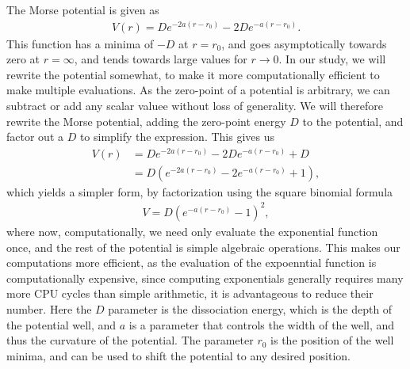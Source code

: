 \documentclass{subfiles}
\begin{document}
The Morse potential is given as
\begin{align*}
    V(r) = De^{-2a(r-r_0)} - 2De^{-a(r-r_0)}.
\end{align*}
This function has a minima of $-D$ at $r = r_0$, and goes asymptotically towards zero at $r=\infty$, and tends towards large values for $r\rightarrow0$. In our study, we will rewrite the potential somewhat, to make it more computationally efficient to make multiple evaluations. As the zero-point of a potential is arbitrary, we can subtract or add any scalar valuee without loss of generality. We will therefore rewrite the Morse potential, adding the zero-point energy $D$ to the potential, and factor out a $D$ to simplify the expression. This gives us
\begin{align*}
    V(r) &= De^{-2a(r-r_0)} - 2De^{-a(r-r_0)} + D \\
    &= D(e^{-2a(r-r_0)} - 2e^{-a(r-r_0)} + 1),
\end{align*}
which yields a simpler form, by factorization using the square binomial formula
\begin{align}
    V = D(e^{-a(r-r_0)} - 1)^2\label{eq:morse_potential},
\end{align}
where now, computationally, we need only evaluate the exponential function once, and the rest of the potential is simple algebraic operations. This makes our computations more efficient, as the evaluation of the expoenntial function is computationally expensive, since computing exponentials generally requires many more CPU cycles than simple arithmetic, it is advantageous to reduce their number. Here the $D$ parameter is the dissociation energy, which is the depth of the potential well, and $a$ is a parameter that controls the width of the well, and thus the curvature of the potential. The parameter $r_0$ is the position of the well minima, and can be used to shift the potential to any desired position.\\
\end{document}

